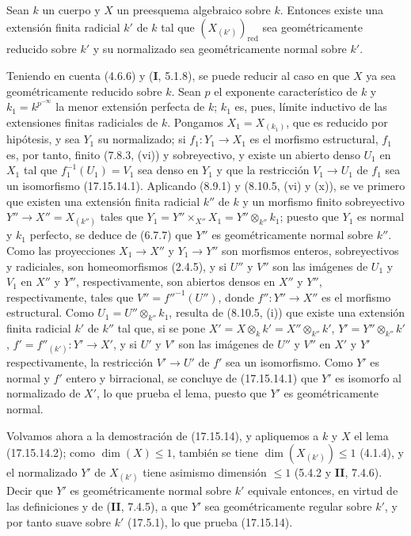 \begin{lemma}[17.15.14.2]
\label{IV.17.15.14.2}
Sean $k$ un cuerpo y $X$ un preesquema algebraico sobre $k$. Entonces existe una extensión finita radicial $k'$ de $k$ tal que $(X_{(k')})_{\mathrm{red}}$ sea geométricamente reducido sobre $k'$ y su normalizado sea geométricamente normal sobre $k'$.
\end{lemma}

Teniendo en cuenta (4.6.6) y (\textbf I, 5.1.8), se puede reducir al caso en que $X$ ya sea geométricamente reducido sobre $k$. Sean $p$ el exponente característico de $k$ y $k_1=k^{p^{-\infty}}$ la menor extensión perfecta de $k$; $k_1$ es, pues, límite inductivo de las extensiones finitas radiciales de $k$. Pongamos $X_1=X_{(k_1)}$, que es reducido por hipótesis, y sea $Y_1$ su normalizado; si $f_1:Y_1\to X_1$ es el morfismo estructural, $f_1$ es, por tanto, finito (7.8.3, (vi)) y sobreyectivo, y existe un abierto denso $U_1$ en $X_1$ tal que $f_1^{-1}(U_1)=V_1$ sea denso en $Y_1$ y que la restricción $V_1\to U_1$ de $f_1$ sea un isomorfismo (17.15.14.1). Aplicando (8.9.1) y (8.10.5, (vi) y (x)), se ve primero que existen una extensión finita radicial $k''$ de $k$ y un morfismo finito sobreyectivo $Y''\to X''=X_{(k'')}$ tales que $Y_1=Y''\times_{X''}X_1=Y''\otimes_{k''}k_1$; puesto que $Y_1$ es normal y $k_1$ perfecto, se deduce de (6.7.7) que $Y''$ es geométricamente normal sobre $k''$. Como las proyecciones $X_1\to X''$ y $Y_1\to Y''$ son morfismos enteros, sobreyectivos y radiciales, son homeomorfismos (2.4.5), y si $U''$ y $V''$ son las imágenes de $U_1$ y $V_1$ en $X''$ y $Y''$, respectivamente, son abiertos densos en $X''$ y $Y''$, respectivamente, tales que $V''=f''^{-1}(U'')$, donde $f'':Y''\to X''$ es el morfismo estructural. Como $U_1=U''\otimes_{k''}k_1$, resulta de (8.10.5, (i)) que existe una extensión finita radicial $k'$ de $k''$ tal que, si se pone $X'=X\otimes_k k'=X''\otimes_{k''}k'$, $Y'=Y''\otimes_{k''}k'$, $f'=f''_{(k')}:Y'\to X'$, y si $U'$ y $V'$ son las imágenes de $U''$ y $V''$ en $X'$ y $Y'$ respectivamente, la restricción $V'\to U'$ de $f'$ sea un isomorfismo. Como $Y'$ es normal y $f'$ entero y birracional, se concluye de (17.15.14.1) que $Y'$ es isomorfo al normalizado de $X'$, lo que prueba el lema, puesto que $Y'$ es geométricamente normal.

Volvamos ahora a la demostración de (17.15.14), y apliquemos a $k$ y $X$ el lema (17.15.14.2); como $\dim(X)\leq1$, también se tiene $\dim(X_{(k')})\leq1$ (4.1.4), y el normalizado $Y'$ de $X_{(k')}$ tiene asimismo dimensión $\leq1$ (5.4.2 y \textbf{II}, 7.4.6). Decir que $Y'$ es geométricamente normal sobre $k'$ equivale entonces, en virtud de las definiciones y de (\textbf{II}, 7.4.5), a que $Y'$ sea geométricamente regular sobre $k'$, y por tanto suave sobre $k'$ (17.5.1), lo que prueba (17.15.14).


